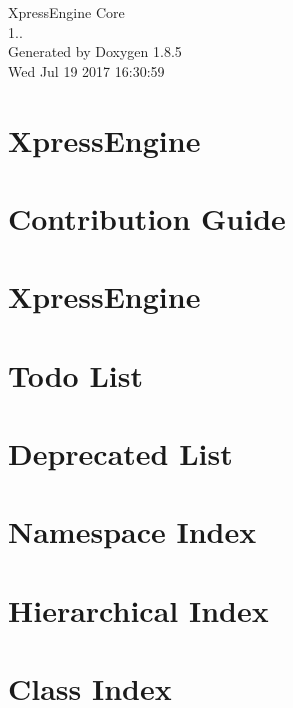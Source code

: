\documentclass[twoside]{book}
\newcommand{\clearemptydoublepage}{%
  \newpage{\pagestyle{empty}\cleardoublepage}%
}
\begin{document}
\hypersetup{pageanchor=false}
\begin{titlepage}
\vspace*{7cm}
\begin{center}%
{\Large Xpress\-Engine Core \\[1ex]\large 1.. }\\
\vspace*{1cm}
{\large Generated by Doxygen 1.8.5}\\
\vspace*{0.5cm}
{\small Wed Jul 19 2017 16:30:59}\\
\end{center}
\end{titlepage}
\clearemptydoublepage
\tableofcontents
\clearemptydoublepage
{}
\hypersetup{pageanchor=true}

\chapter{Xpress\-Engine}
\label{index}\hypertarget{index}{}
\chapter{Contribution Guide}
\label{md_CONTRIBUTING}
\hypertarget{md_CONTRIBUTING}{}

\chapter{Xpress\-Engine}
\label{md_README}
\hypertarget{md_README}{}

\chapter{Todo List}
\label{todo}
\hypertarget{todo}{}

\chapter{Deprecated List}
\label{deprecated}
\hypertarget{deprecated}{}

\chapter{Namespace Index}

\chapter{Hierarchical Index}

\chapter{Class Index}

\end{document}
